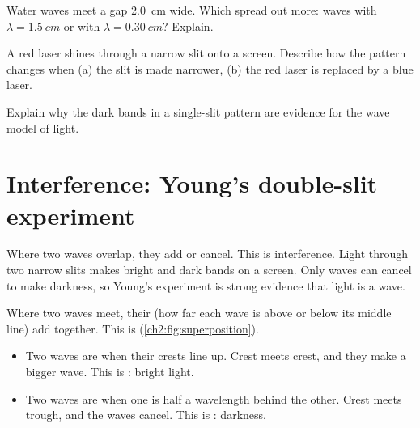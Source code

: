 \begin{quickcheck}
  \item Water waves meet a gap \qty{2.0}{cm} wide. Which spread out more: waves with
        $\lambda = \qty{1.5}{cm}$ or with $\lambda = \qty{0.30}{cm}$? Explain.
  \item A red laser shines through a narrow slit onto a screen. Describe how the pattern
        changes when (a) the slit is made narrower, (b) the red laser is replaced by a
        blue laser.
  \item Explain why the dark bands in a single-slit pattern are evidence for the wave
        model of light.
\end{quickcheck}

\section{Interference: Young's double-slit experiment}\label{ch2:sec:interference}

\begin{bigidea}
Where two waves overlap, they add or cancel. This is interference. Light through two
narrow slits makes bright and dark bands on a screen. Only waves can cancel to make
darkness, so Young's experiment is strong evidence that light is a wave.
\end{bigidea}

\begin{keywords}
\end{keywords}

Where two waves meet, their  (how far each wave is above or below
its middle line) add together. This is 
(\cref{ch2:fig:superposition}).
\begin{itemize}
  \item Two waves are  when their crests line up. Crest meets crest, and
        they make a bigger wave. This is : bright light.
  \item Two waves are  when one is half a wavelength behind
        the other. Crest meets trough, and the waves cancel. This is
        : darkness.
\end{itemize}


